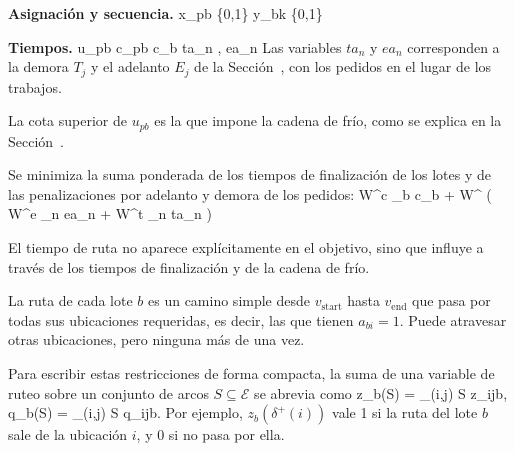 {\bf Asignación y secuencia.}
\startformula
	\startalign[n=2, align={right,left}]
		\NC x_{pb} \in \{0,1\} \NC \quad {} \NR
		\NC y_{bk} \in \{0,1\} \NC \quad {} \NR
	\stopalign
\stopformula

{\bf Tiempos.}
\startformula
	\startalign[n=2, align={right,left}]
		\NC u_{pb}  \NC \quad {} \NR
		\NC c_{pb}  \NC \quad {} \NR
		\NC c_b  \NC \quad {} \NR
		\NC ta_n ,\; ea_n  \NC \quad {} \NR
	\stopalign
\stopformula
Las variables $ta_n$ y $ea_n$ corresponden a la demora $T_j$ y el adelanto
$E_j$ de la Sección~, con los pedidos en el
lugar de los trabajos.

La cota superior de $u_{pb}$ es la que impone la cadena de frío, como se
explica en la Sección~.

\stopsubsection

\startsubsection[title={Función objetivo}]

Se minimiza la suma ponderada de los tiempos de finalización de los lotes y
de las penalizaciones por adelanto y demora de los pedidos:
\startplaceformula[reference=eq:mono_objetivo]
\startformula
	\min \quad W^{c} \sum_{b \in {}} c_b \;+\; W^{} \left( W^{e} \sum_{n \in {}} ea_n + W^{t} \sum_{n \in {}} ta_n \right)
\stopformula
\stopplaceformula

El tiempo de ruta no aparece explícitamente en el objetivo, sino que influye
a través de los tiempos de finalización y de la cadena de frío.

\stopsubsection

\startsubsection[title={Restricciones de ruteo}]

La ruta de cada lote $b$ es un camino simple desde $v_{\text{start}}$ hasta
$v_{\text{end}}$ que pasa por todas sus ubicaciones requeridas, es decir, las
que tienen $a_{bi} = 1$. Puede atravesar otras ubicaciones, pero ninguna más
de una vez.

Para escribir estas restricciones de forma compacta, la suma de una variable
de ruteo sobre un conjunto de arcos $S \subseteq \mathcal{E}$ se abrevia como
\startformula
	z_b(S) = \sum_{(i,j) \in S} z_{ijb}, \qquad q_b(S) = \sum_{(i,j) \in S} q_{ijb}.
\stopformula
Por ejemplo, $z_b(\delta^{+}(i))$ vale 1 si la ruta del lote $b$ sale de la
ubicación $i$, y 0 si no pasa por ella.

